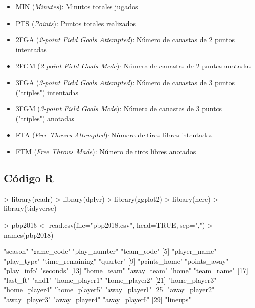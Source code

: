 \documentclass[paper=a4, fontsize=9pt]{article}
\begin{document}
\begin{itemize}
\item MIN (\emph{Minutes}): Minutos totales jugados
\item PTS (\emph{Points}): Puntos totales realizados
\item 2FGA (\emph{2-point Field Goals Attempted}): Número de canastas de 2 puntos intentadas
\item 2FGM (\emph{2-point Field Goals Made}): Número de canastas de 2 puntos anotadas
\item 3FGA (\emph{3-point Field Goals Attempted}): Número de canastas de 3 puntos ("triples") intentadas
\item 3FGM (\emph{3-point Field Goals Made}): Número de canastas de 3 puntos ("triples") anotadas
\item FTA (\emph{Free Throws Attempted}): Número de tiros libres intentados
\item FTM (\emph{Free Throws Made}): Número de tiros libres anotados
\end{itemize}

\clearpage

\subsection{Código R} \label{sec:Annexo2}

\begin{Schunk}
\begin{Sinput}
> library(readr)
> library(dplyr)
> library(ggplot2)
> library(here)
> library(tidyverse)
\end{Sinput}
\end{Schunk}

\begin{Schunk}
\begin{Sinput}
> pbp2018 <- read.csv(file="pbp2018.csv", head=TRUE, sep=",")
> names(pbp2018)
\end{Sinput}
\begin{Soutput}
 [1] "season"         "game_code"      "play_number"    "team_code"     
 [5] "player_name"    "play_type"      "time_remaining" "quarter"       
 [9] "points_home"    "points_away"    "play_info"      "seconds"       
[13] "home_team"      "away_team"      "home"           "team_name"     
[17] "last_ft"        "and1"           "home_player1"   "home_player2"  
[21] "home_player3"   "home_player4"   "home_player5"   "away_player1"  
[25] "away_player2"   "away_player3"   "away_player4"   "away_player5"  
[29] "lineups"       
\end{Soutput}
\end{Schunk}
\end{document}
